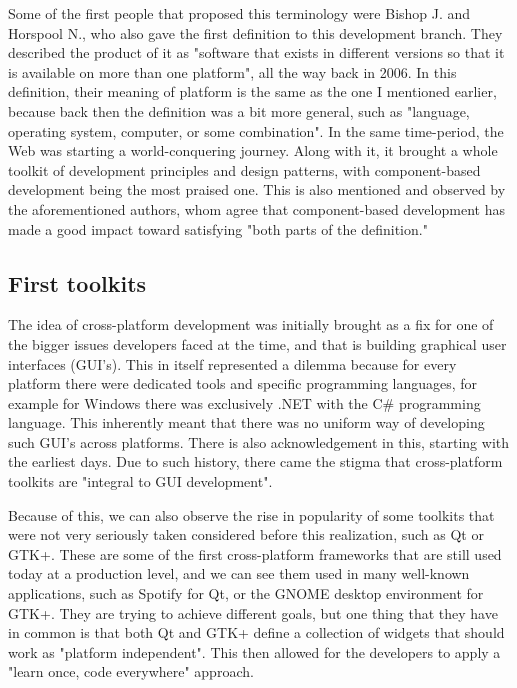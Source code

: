 \par
Some of the first people that proposed this terminology were Bishop J.
and Horspool N., who also gave the first definition to this development branch.
They described the product of it as "software that exists in different versions so that it is available on more than one platform"\cite{firstDefinition}, all the way back in 2006.
In this definition, their meaning of platform is the same as the one I mentioned earlier, because back then the definition was a bit more general, such as "language, operating system, computer, or some combination".
In the same time-period, the Web was starting a world-conquering journey.
Along with it, it brought a whole toolkit of development principles and design patterns, with component-based development being the most praised one.
This is also mentioned and observed by the aforementioned authors, whom agree that component-based development  has made a good impact  toward satisfying "both parts of the definition."\cite{firstDefinition}

\subsection{First toolkits}
The idea of cross-platform development was initially brought as a fix for one of the bigger issues developers faced at the time, and that is building graphical user interfaces (GUI's).
This in itself represented a dilemma because for every platform there were dedicated tools and specific programming languages, for example for Windows there was exclusively .NET with the C\# programming language.
This inherently meant that there was no uniform way of developing such GUI's across platforms.
There is also acknowledgement in this, starting with the earliest days.
Due to such history, there came the stigma that cross-platform toolkits are "integral to GUI development"\cite{firstDefinition}.

\par
Because of this, we can also observe the rise in popularity of some toolkits that were not very seriously taken considered before this realization, such as Qt or GTK+.
These are some of the first cross-platform frameworks that are still used today at a production level, and we can see them used in many well-known applications, such as Spotify for Qt, or the GNOME desktop environment for GTK+.
They are trying to achieve different goals, but one thing that they have in common is that both Qt and GTK+ define a collection of widgets that should work as "platform independent"\cite{firstDefinition}.
This then allowed for the developers to apply a "learn once, code everywhere" approach.

